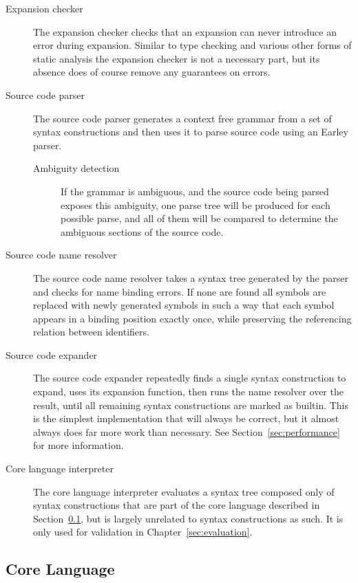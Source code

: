 \documentclass{kththesis}
\begin{document}
\begin{description}
  \item[Expansion checker] The expansion checker checks that an expansion can never introduce an error during expansion. Similar to type checking and various other forms of static analysis the expansion checker is not a necessary part, but its absence does of course remove any guarantees on errors.

  \item[Source code parser] The source code parser generates a context free grammar from a set of syntax constructions and then uses it to parse source code using an Earley parser.
  \begin{description}
    \item[Ambiguity detection] If the grammar is ambiguous, and the source code being parsed exposes this ambiguity, one parse tree will be produced for each possible parse, and all of them will be compared to determine the ambiguous sections of the source code.
  \end{description}

  \item[Source code name resolver] The source code name resolver takes a syntax tree generated by the parser and checks for name binding errors. If none are found all symbols are replaced with newly generated symbols in such a way that each symbol appears in a binding position exactly once, while preserving the referencing relation between identifiers.

  \item[Source code expander] The source code expander repeatedly finds a single syntax construction to expand, uses its expansion function, then runs the name resolver over the result, until all remaining syntax constructions are marked as builtin. This is the simplest implementation that will always be correct, but it almost always does far more work than necessary. See Section~\ref{sec:performance} for more information.

  \item[Core language interpreter] The core language interpreter evaluates a syntax tree composed only of syntax constructions that are part of the core language described in Section~\ref{sec:core-language}, but is largely unrelated to syntax constructions as such. It is only used for validation in Chapter~\ref{sec:evaluation}.
\end{description}

\subsection{Core Language} \label{sec:core-language}
\end{document}
